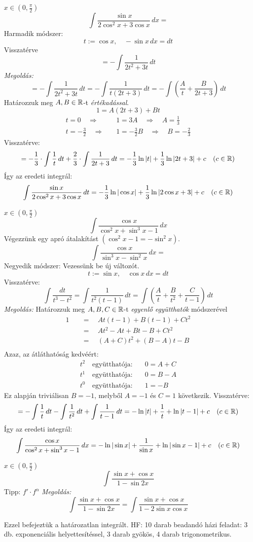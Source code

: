 \documentclass[a4paper,11.5pt]{article}
\begin{document}
	\begin{exercise}$x\in\left(0,\frac{\pi}{2}\right)$
		\[ \int\frac{\sin x}{2\cos^2x+3\cos x}\,dx= \]
		Harmadik módszer:
		\[ t:=\cos x,\quad -\sin x\,dx=dt \]
		Visszatérve
		\[ =-\int\frac{1}{2t^2+3t}\,dt \]
		\textit{Megoldás:} 
		\[ =-\int\frac{1}{2t^2+3t}\,dt=-\int\frac{1}{t(2t+3)}\,dt=-\int\left(\frac{A}{t}+\frac{B}{2t+3}\right)\,dt \]
		Határozzuk meg $A,B\in\mathbb{R}$-t \textit{értékadással}.
		\[ 1=A(2t+3)+Bt \]
		\vspace{-7mm}
		\begin{align*}
			t=0\quad \Rightarrow&\quad 1=3A\quad \Rightarrow\quad A=\frac{1}{3}\\
			t=-\frac{3}{2}\quad \Rightarrow&\quad 1=-\frac{3}{2}B\quad \Rightarrow \quad B=-\frac{2}{3}
		\end{align*}
		Visszatérve:
		\[ =-\frac{1}{3}\cdot\int\frac{1}{t}\,dt+\frac{2}{3}\cdot\int\frac{1}{2t+3}\,dt=-\frac{1}{3}\ln|t|+\frac{1}{3}\ln|2t+3|+c\quad (c\in\mathbb{R}) \]
		Így az eredeti integrál:
		\[ \int\frac{\sin x}{2\cos^2x+3\cos x}\,dt=-\frac{1}{3}\ln|\cos x|+\frac{1}{3}\ln|2\cos x+3|+c\quad (c\in\mathbb{R}) \]
	\end{exercise}
	\begin{exercise}$x\in\left(0,\frac{\pi}{2}\right)$
		\[ \int\frac{\cos x}{\cos^2x+\sin^3x-1}\,dx \]
		Végezzünk egy apró átalakítást $(\cos^2x-1 = -\sin^2x)$.
		\[ \int\frac{\cos x}{\sin^3x-\sin^2x}\,dx= \]
		Negyedik módszer: Vezessünk be új változót.
		\[ t:=\sin x,\quad \cos x\,dx=dt \]
		Visszatérve:
		\[ \int\frac{dt}{t^3-t^2}=\int\frac{1}{t^2(t-1)}\,dt=\int\left(\frac{A}{t}+\frac{B}{t^2}+\frac{C}{t-1}\right)\,dt \]
		\textit{Megoldás:} Határozzuk meg $A,B,C\in\mathbb{R}$-t \textit{egyenlő együtthatók} módszerével
		\begin{align*}
			1\quad &=\quad At(t-1)+B(t-1)+Ct^2\\
				   &=\quad At^2-At+Bt-B+Ct^2\\
				   &=\quad (A+C)t^2+(B-A)t-B\\
		\end{align*}
		Azaz, az átláthatóság kedvéért:
		\begin{align*}
			t^2 \quad \text{együtthatója:}&\quad  0=A+C\\
			t^1 \quad \text{együtthatója:}&\quad  0=B-A\\
			t^0 \quad \text{együtthatója:}&\quad  1=-B
		\end{align*}
		Ez alapján triviálisan $B=-1$, melyből $A=-1$ és $C=1$ következik. Visszatérve:
		\[ =-\int\frac{1}{t}\,dt-\int\frac{1}{t^2}\,dt+\int\frac{1}{t-1}\,dt=-\ln|t|+\frac{1}{t}+\ln|t-1|+c\quad (c\in\mathbb{R}) \]
		Így az eredeti integrál:
		\[ \int\frac{\cos x}{\cos^2x+\sin^3x-1}\,dx=-\ln|\sin x|+\frac{1}{\sin x}+\ln|\sin x-1|+c\quad (c\in\mathbb{R}) \]
	\end{exercise}
	\begin{exercise}$x\in\left(0,\frac{\pi}{2}\right)$
		\[ \int\frac{\sin x+\cos x}{1-\sin2x} \]
		Tipp: $f'\cdot f^\alpha$
		\textit{Megoldás:}
		\[ \int\frac{\sin x+\cos x}{1-\sin2x}=\int\frac{\sin x+\cos x}{1-2\sin x\cos x} \]
		
	\end{exercise}
	Ezzel befejeztük a határozatlan integrált. HF: 10 darab beadandó házi feladat: 3 db. exponenciális helyettesítéssel, 3 darab gyökös, 4 darab trigonometrikus.
\end{document}
